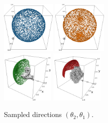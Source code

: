 \begin{figure}[ht!]
    \centering
    \begin{minipage}{.33\linewidth}
        \begin{subfigure}[b]{\linewidth}
            \centering
            \includegraphics[height=2.5cm]{figures/uniform_quaternion.png}%
            \hfill
            \includegraphics[height=2.5cm]{figures/uniform_angles.png}
            \\ \vspace{0.2cm}
            \includegraphics[height=2.5cm]{figures/5j0n-cvg2.pdf}
            \hfill
            \includegraphics[height=2.5cm]{figures/5a1a-cvg2.pdf}
            \caption{Sampled directions $(\theta_2, \theta_1)$.}%
            \label{fig:orientation-sampling}
        \end{subfigure}
    \end{minipage}
    \hfill
    \begin{minipage}{.65\linewidth}
        \begin{subfigure}[b]{0.37\linewidth}
            \centering

\end{subfigure}
\end{minipage}
\end{figure}
